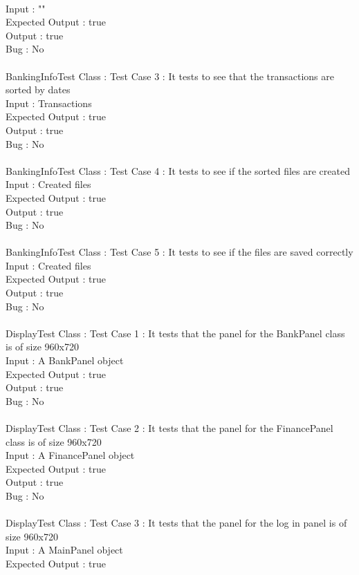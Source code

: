 \documentclass{article}
\begin{document}
\\Input : ""
\\Expected Output : true
\\Output : true
\\Bug : No
\\\\BankingInfoTest Class : Test Case 3 : It tests to see that the transactions are sorted by dates
\\Input : Transactions
\\Expected Output : true
\\Output : true
\\Bug : No
\\\\BankingInfoTest Class : Test Case 4 : It tests to see if the sorted files are created
\\Input : Created files
\\Expected Output : true
\\Output : true
\\Bug : No
\\\\BankingInfoTest Class : Test Case 5 : It tests to see if the files are saved correctly
\\Input : Created files
\\Expected Output : true
\\Output : true
\\Bug : No
\\\\DisplayTest Class : Test Case 1 : It tests that the panel for the BankPanel class is of size 960x720
\\Input : A BankPanel object
\\Expected Output : true
\\Output : true
\\Bug : No
\\\\DisplayTest Class : Test Case 2 : It tests that the panel for the FinancePanel class is of size 960x720
\\Input : A FinancePanel object
\\Expected Output : true
\\Output : true
\\Bug : No
\\\\DisplayTest Class : Test Case 3 : It tests that the panel for the log in panel is of size 960x720
\\Input : A MainPanel object
\\Expected Output : true
\end{document}
